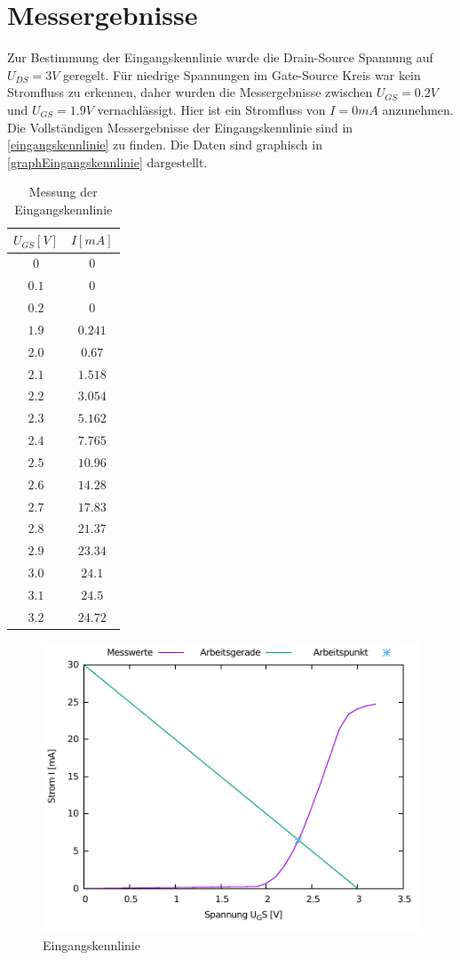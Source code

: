 \documentclass[11pt, a4paper]{article}
\begin{document}
\section*{Messergebnisse}
Zur Bestimmung der Eingangskennlinie wurde die Drain-Source Spannung auf $U_{DS} = 3 V$ geregelt. Für niedrige Spannungen im Gate-Source Kreis war kein Stromfluss zu erkennen, daher wurden die Messergebnisse zwischen $U_{GS} = 0.2 V$ und $U_{GS} = 1.9 V$
vernachlässigt. Hier ist ein Stromfluss von $I = 0 mA$ anzunehmen. Die Vollständigen Messergebnisse der Eingangskennlinie sind in \autoref{eingangskennlinie} zu finden. Die Daten sind graphisch in \autoref{graphEingangskennlinie} dargestellt.
\begin{table}[h]
\centering
\begin{tabular}{c|c}
$U_{GS} [V]$ & $I [mA]$ \\ \hline
$0$ 	& $0$ \\
$0.1$ 	& $0$ \\
$0.2$ 	& $0$ \\
$1.9$	& $0.241$ \\
$2.0$	& $0.67$ \\
$2.1$	& $1.518$ \\
$2.2$	& $3.054$ \\
$2.3$	& $5.162$ \\
$2.4$	& $7.765$ \\
$2.5$	& $10.96$ \\
$2.6$	& $14.28$ \\
$2.7$	& $17.83$ \\
$2.8$	& $21.37$ \\
$2.9$	& $23.34$ \\
$3.0$	& $24.1$ \\
$3.1$	& $24.5$ \\
$3.2$	& $24.72$
\end{tabular}
\caption{Messung der Eingangskennlinie}
\label{eingangskennlinie}
\end{table}
\begin{figure}
    \centering
    \includegraphics[width=\linewidth]{eingang.pdf}
    \caption{Eingangskennlinie}
    \label{graphEingangskennlinie}
\end{figure}
\end{document}
